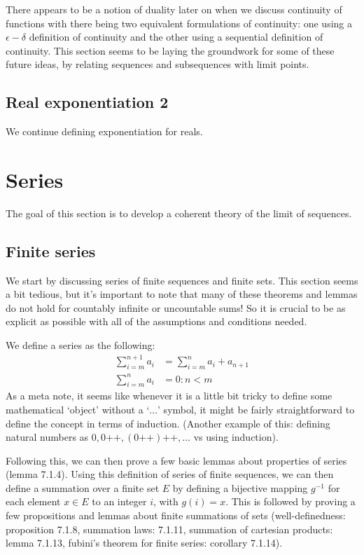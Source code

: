 \documentclass[answers,12pt]{exam}
\newcommand{\increment}{\text{++}}
\begin{document}
There appears to be a notion of duality later on when we discuss continuity of functions with there being two equivalent formulations of continuity: one using a $\epsilon-\delta$ definition of continuity and the other using a sequential definition of continuity.
This section seems to be laying the groundwork for some of these future ideas, by relating sequences and subsequences with limit points.

\subsection{Real exponentiation 2}
We continue defining exponentiation for reals.

\section{Series}
The goal of this section is to develop a coherent theory of the limit of sequences.

\subsection{Finite series}
We start by discussing series of finite sequences and finite sets.
This section seems a bit tedious, but it's important to note that many of these theorems and lemmas do not hold for countably infinite or uncountable sums!
So it is crucial to be as explicit as possible with all of the assumptions and conditions needed.

We define a series as the following:
\[
    \begin{aligned}
        \sum_{i=m}^{n+1} a_i &= \sum_{i=m}^{n} a_i + a_{n+1}\\
        \sum_{i=m}^{n} a_i &= 0: n < m
    \end{aligned}
\]
As a meta note, it seems like whenever it is a little bit tricky to define some mathematical `object' without a `$\dots$' symbol, it might be fairly straightforward to define the concept in terms of induction.
(Another example of this: defining natural numbers as $0, 0 \increment, (0 \increment) \increment, \dots$ vs using induction). 

Following this, we can then prove a few basic lemmas about properties of series (lemma 7.1.4).
Using this definition of series of finite sequences, we can then define a summation over a finite set $E$ by defining a bijective mapping $g^{-1}$ for each element $x \in E$ to an integer $i$, with $g(i) = x$.
This is followed by proving a few propositions and lemmas about finite summations of sets (well-definedness: proposition 7.1.8, summation laws: 7.1.11, summation of cartesian products: lemma 7.1.13, fubini's theorem for finite series: corollary 7.1.14). 
\end{document}
